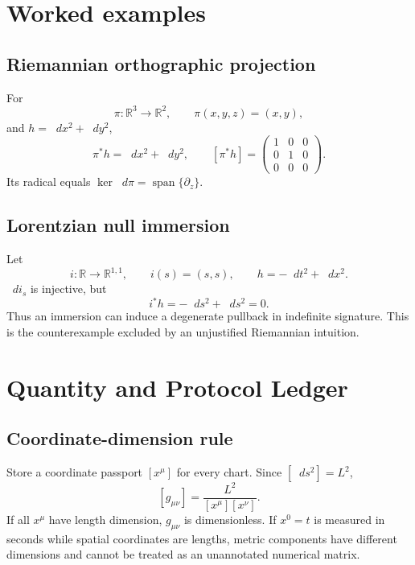 \documentclass[11pt,a4paper]{article}
\theoremstyle{definition}
\theoremstyle{plain}
\theoremstyle{remark}
\newcommand{\R}{\mathbb{R}}
\newcommand{\dd}{\mathop{}\!d}
\begin{document}
\section{Worked examples}

\subsection{Riemannian orthographic projection}

For
\[
\pi:\R^3\to\R^2,\qquad
\pi(x,y,z)=(x,y),
\]
and $h=\dd x^2+\dd y^2$,
\[
\pi^*h=\dd x^2+\dd y^2,\qquad
[\pi^*h]=
\begin{pmatrix}
1&0&0\\
0&1&0\\
0&0&0
\end{pmatrix}.
\]
Its radical equals $\ker\dd\pi=\operatorname{span}\{\partial_z\}$.

\subsection{Lorentzian null immersion}

Let
\[
i:\R\to\R^{1,1},\qquad i(s)=(s,s),
\qquad
h=-\dd t^2+\dd x^2.
\]
$\dd i_s$ is injective, but
\[
i^*h=-\dd s^2+\dd s^2=0.
\]
Thus an immersion can induce a degenerate pullback in indefinite
signature. This is the counterexample excluded by an unjustified
Riemannian intuition.

\section{Quantity and Protocol Ledger}

\subsection{Coordinate-dimension rule}

Store a coordinate passport $[x^\mu]$ for every chart. Since
$[\dd s^2]=L^2$,
\[
[g_{\mu\nu}]
=\frac{L^2}{[x^\mu][x^\nu]}.
\]
If all $x^\mu$ have length dimension, $g_{\mu\nu}$ is dimensionless. If
$x^0=t$ is measured in seconds while spatial coordinates are lengths,
metric components have different dimensions and cannot be treated as an
unannotated numerical matrix.
\end{document}
